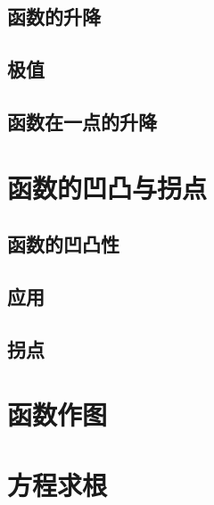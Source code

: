 \subsection{函数的升降}
\subsection{极值}
\subsection{函数在一点的升降}
\begin{exercise}
\item
\end{exercise}
\section{函数的凹凸与拐点}
\subsection{函数的凹凸性}
\subsection{应用}
\subsection{拐点}
\begin{exercise}
\item
\end{exercise}
\section{函数作图}
\begin{exercise}
\item
\end{exercise}
\section{方程求根}
\begin{exercise}
\item
\end{exercise}
\begin{exercise*}
\item
\end{exercise*}


\endinput
